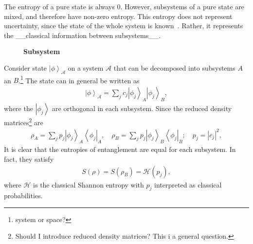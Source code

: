 \documentclass[12pt]{article} %
\renewcommand{\cal}{\mathcal}
\newcommand{\ket}[1]{\left|#1\right\rangle}
\newcommand{\bra}[1]{\left\langle#1\right|}
\begin{document}
The entropy of a pure state is always 0. However, subsystems of a pure state are mixed, and therefore have non-zero entropy. This entropy does not represent uncertainty, since the state of the whole system is known~\cite{janzing09}. Rather, it represents the \_\_classical information between subsystems\_\_.

\begin{figure}
	\centering
	\caption{\textbf{Subsystem}}
	\label{fig:subsys}
\end{figure}

Consider state $\ket{\phi}_\cal{A}$ on a system $\cal A$ that can be decomposed into subsystems $A$ an $B$.\footnote{system or space?} The state can in general be written as 
\begin{align}
\ket{\phi}_\cal{A} = \sum_jc_j\ket{\phi_j}_A\ket{\phi_j}_B,
\end{align}
where the $\ket{\phi_j}$ are orthogonal in each subsystem. Since the reduced density matrices\footnote{Should I introduce reduced density matrices? This i a general question.} are
\begin{align}
\rho_A = \sum_jp_j\ket{\phi_j}_A\bra{\phi_j}_A, \quad \rho_B = \sum_jp_j\ket{\phi_j}_B\bra{\phi_j}_B; \quad p_j = |c_j|^2,
\end{align}
It is clear that the entropies of entanglement are equal for each subsystem. In fact, they satisfy 
\begin{align}
S(\rho) = S(\rho_B) = \cal{H}(p_j),
\end{align}
where $\cal H$ is the classical Shannon entropy with $p_j$ interpreted as classical probabilities. 
\end{document}
